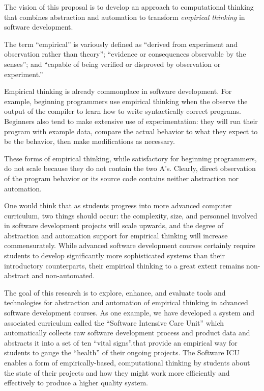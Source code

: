 The vision of this proposal is to develop an approach to computational
thinking that combines abstraction and automation to transform {\em
empirical thinking} in software development.

The term ``empirical'' is variously defined as ``derived from experiment
and observation rather than theory''; ``evidence or consequences observable
by the senses''; and ``capable of being verified or disproved by
observation or experiment.''

Empirical thinking is already commonplace in software development.  For
example, beginning programmers use empirical thinking when the observe the
output of the compiler to learn how to write syntactically correct
programs.  Beginners also tend to make extensive use of experimentation:
they will run their program with example data, compare the actual behavior
to what they expect to be the behavior, then make modifications as
necessary.

These forms of empirical thinking, while satisfactory for beginning
programmers, do not scale because they do not contain the two A's.
Clearly, direct observation of the program behavior or its source code
contains neither abstraction nor automation.

One would think that as students progress into more advanced computer
curriculum, two things should occur: the complexity, size, and personnel
involved in software development projects will scale upwards, and the
degree of abstraction and automation support for empirical thinking will
increase commensurately. While advanced software development courses
certainly require students to develop significantly more sophisticated
systems than their introductory counterparts, their empirical thinking to a
great extent remains non-abstract and non-automated. 

The goal of this research is to explore, enhance, and evaluate tools and
technologies for abstraction and automation of empirical thinking in
advanced software development courses.  As one example, we have developed a
system and associated curriculum called the ``Software Intensive Care
Unit'' which automatically collects raw software development process and
product data and abstracts it into a set of ten ``vital signs''.that
provide an empirical way for students to gauge the ``health'' of their
ongoing projects.  The Software ICU enables a form of empirically-based,
computational thinking by students about the state of their projects and
how they might work more efficiently and effectively to produce a higher
quality system.

